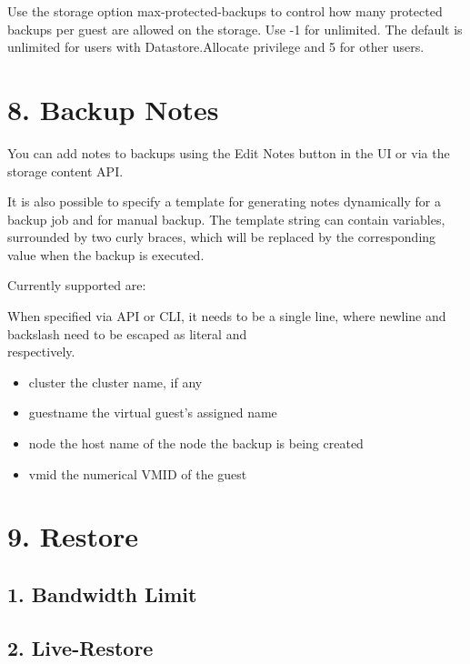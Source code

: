 Use the storage option max-protected-backups to control how many protected backups per guest are allowed on the storage. Use -1 for unlimited. The default is unlimited for users with Datastore.Allocate privilege and 5 for other users.


\section{8. Backup Notes}

You can add notes to backups using the Edit Notes button in the UI or via the storage content API.

It is also possible to specify a template for generating notes dynamically for a backup job and for manual backup. The template string can contain variables, surrounded by two curly braces, which will be replaced by the corresponding value when the backup is executed.

Currently supported are:

When specified via API or CLI, it needs to be a single line, where newline and backslash need to be escaped as literal \n and \\ respectively.

\begin{itemize}[leftmargin=2cm]

	\item {{cluster}} the cluster name, if any

	\item {{guestname}} the virtual guest’s assigned name

	\item {{node}} the host name of the node the backup is being created

	\item {{vmid}} the numerical VMID of the guest

\end{itemize}


\section{9. Restore}

\subsection{1. Bandwidth Limit}

\subsection{2. Live-Restore}

